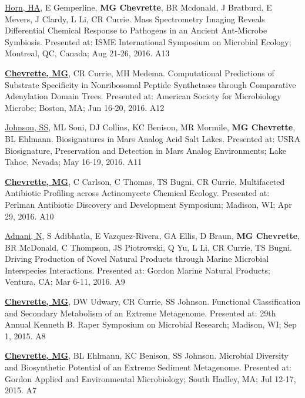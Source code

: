 \begin{cvpubs}
  \cvpub
    {\underline{Horn, HA}, E Gemperline, \textbf{MG Chevrette}, BR Mcdonald, J Bratburd, E Mevers, J Clardy, L Li, CR Currie.  Mass Spectrometry Imaging Reveals Differential Chemical Response to Pathogens in an Ancient Ant-Microbe Symbiosis.  Presented at: ISME International Symposium on Microbial Ecology; Montreal, QC, Canada; Aug 21-26, 2016.} %
    {A13} %


  \cvpub
    {\textbf{\underline{Chevrette, MG}}, CR Currie, MH Medema.  Computational Predictions of Substrate Specificity in Nonribosomal Peptide Synthetases through Comparative Adenylation Domain Trees.  Presented at: American Society for Microbiology Microbe; Boston, MA; Jun 16-20, 2016.} %
    {A12} %
    
  \cvpub
    {\underline{Johnson, SS}, ML Soni, DJ Collins, KC Benison, MR Mormile, \textbf{MG Chevrette}, BL Ehlmann.  Biosignatures in Mars Analog Acid Salt Lakes.  Presented at: USRA Biosignature, Preservation and Detection in Mars Analog Environments; Lake Tahoe, Nevada; May 16-19, 2016.} %
    {A11} %

  \cvpub
    {\textbf{\underline{Chevrette, MG}}, C Carlson, C Thomas, TS Bugni, CR Currie.  Multifaceted Antibiotic Profiling across Actinomycete Chemical Ecology.  Presented at: Perlman Antibiotic Discovery and Development Symposium; Madison, WI; Apr 29, 2016.} %
    {A10} %

  \cvpub
    {\underline{Adnani, N}, S Adibhatla, E Vazquez-Rivera, GA Ellis, D Braun, \textbf{MG Chevrette}, BR McDonald, C Thompson, JS Piotrowski, Q Yu, L Li, CR Currie, TS Bugni.  Driving Production of Novel Natural Products through Marine Microbial Interspecies Interactions.  Presented at: Gordon Marine Natural Products; Ventura, CA; Mar 6-11, 2016.} %
    {A9} %
    
  \cvpub
    {\textbf{\underline{Chevrette, MG}}, DW Udwary, CR Currie, SS Johnson.  Functional Classification and Secondary Metabolism of an Extreme Metagenome.  Presented at: 29th Annual Kenneth B. Raper Symposium on Microbial Research; Madison, WI; Sep 1, 2015.} %
    {A8} %
    
  \cvpub
    {\textbf{\underline{Chevrette, MG}}, BL Ehlmann, KC Benison, SS Johnson.  Microbial Diversity and Biosynthetic Potential of an Extreme Sediment Metagenome.  Presented at: Gordon Applied and Environmental Microbiology; South Hadley, MA; Jul 12-17, 2015.} %
    {A7} %
    

\end{cvpubs}
